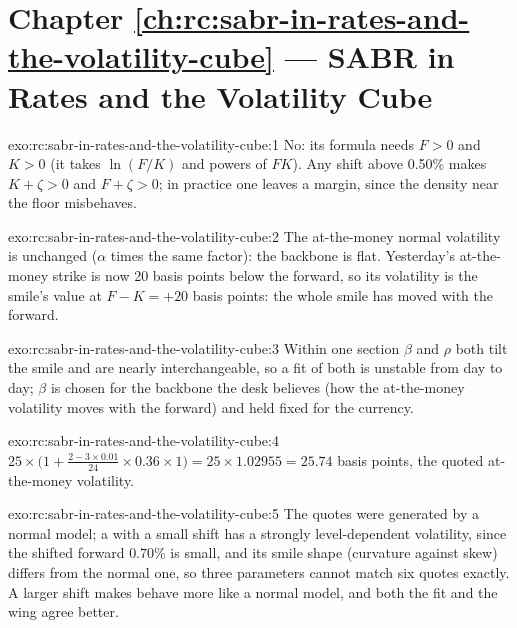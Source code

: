 \section*{Chapter \ref{ch:rc:sabr-in-rates-and-the-volatility-cube} --- SABR in Rates and the Volatility Cube}

\begin{solution}{exo:rc:sabr-in-rates-and-the-volatility-cube:1}
No: its formula needs $F>0$ and $K>0$ (it takes $\ln(F/K)$ and powers of $FK$).
Any shift above 0.50\% makes $K+\zeta>0$ and $F+\zeta>0$; in practice one leaves a
margin, since the density near the floor misbehaves.
\end{solution}

\begin{solution}{exo:rc:sabr-in-rates-and-the-volatility-cube:2}
The at-the-money normal volatility is unchanged ($\alpha$ times the same factor):
the backbone is flat. Yesterday's at-the-money strike is now 20 basis points
below the forward, so its volatility is the smile's value at $F-K=+20$ basis
points: the whole smile has moved with the forward.
\end{solution}

\begin{solution}{exo:rc:sabr-in-rates-and-the-volatility-cube:3}
Within one section $\beta$ and $\rho$ both tilt the smile and are nearly
interchangeable, so a fit of both is unstable from day to day; $\beta$ is chosen
for the backbone the desk believes (how the at-the-money volatility moves with
the forward) and held fixed for the currency.
\end{solution}

\begin{solution}{exo:rc:sabr-in-rates-and-the-volatility-cube:4}
$25\times\bigl(1+\tfrac{2-3\times0.01}{24}\times0.36\times1\bigr) = 25\times1.02955 =
25.74$ basis points, the quoted at-the-money volatility.
\end{solution}

\begin{solution}{exo:rc:sabr-in-rates-and-the-volatility-cube:5}
The quotes were generated by a normal model; a  with a
small shift has a strongly level-dependent volatility, since the shifted
forward $0.70\%$ is small, and its smile shape (curvature against skew) differs
from the normal one, so three parameters cannot match six quotes exactly. A
larger shift makes  behave more like a normal model, and both the
fit and the wing agree better.
\end{solution}

